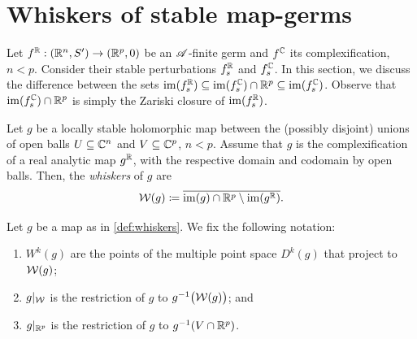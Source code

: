 \documentclass[a4paper,12pt]{amsart}
\begin{document}










\section{Whiskers of stable map-germs}\label{sec:whiskers}

Let $f^{\mathbb{R}}:(\mathbb{R}^n,S')\to(\mathbb{R}^p,0)$ be an $\mathscr{A}$-finite germ and $f^{\mathbb{C}}$ its complexification, $n<p$. Consider their stable perturbations $f^{\mathbb{R}}_s$ and $f^{\mathbb{C}}_s$. In this section, we discuss the difference between the sets $\operatorname{im}(f^{\mathbb{R}}_s)\subseteq\operatorname{im}(f^{\mathbb{C}}_s)\cap\mathbb{R}^p\subseteq\operatorname{im}(f^{\mathbb{C}}_s)$. Observe that $\operatorname{im}(f^{\mathbb{C}}_s)\cap\mathbb{R}^p$ is simply the Zariski closure of $\operatorname{im}(f^{\mathbb{R}}_s)$.

\begin{definition}\label{def:whiskers}
Let $g$ be a locally stable holomorphic map between the (possibly disjoint) unions of open balls $U\subseteq \mathbb{C}^n$ and $V\subseteq \mathbb{C}^p$, $n<p$. Assume that $g$ is the complexification of a real analytic map $g^{\mathbb{R}}$, with the respective domain and codomain by open balls. Then, the \textit{whiskers} of $g$ are
\[\mathcal{W}(g) \coloneqq\overline{\operatorname{im}(g)\cap\mathbb{R}^p\setminus \operatorname{im}(g^{\mathbb{R}})}.\]
\end{definition}

\begin{notation}\label{notation}
Let $g$ be a map as in \cref{def:whiskers}. We fix the following notation:
\begin{enumerate}[label=(\roman*)]
	\item $W^k(g)$ are the points of the multiple point space $D^k(g)$ that project to $\mathcal{W}(g)$;
   \item $g\rvert_{\mathcal{W}}$ is the restriction of $g$ to $g^{-1}\big(\mathcal{W}(g)\big)$; and
   \item $g\rvert_{\mathbb{R}^p}$ is the restriction of $g$ to $g^{-1}(V\cap\mathbb{R}^p)$.
\end{enumerate}
\end{notation}
\end{document}
